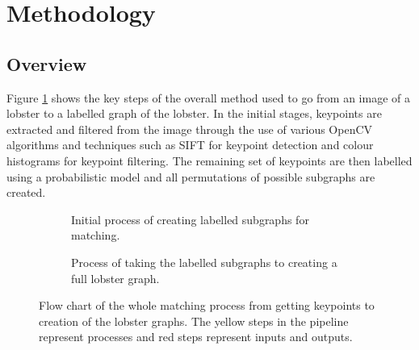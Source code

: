 \section{Methodology}\label{sec:design}
\renewcommand{\imgpath}{tex/design/imgs}
\vspace{1cm}

\subsection{Overview}
Figure \ref{fig:overview} shows the key steps of the overall method used to go from an image of a lobster to a labelled graph of the lobster. In the initial stages, keypoints are extracted and filtered from the image through the use of various OpenCV algorithms and techniques such as SIFT for keypoint detection and colour histograms for keypoint filtering. The remaining set of keypoints are then labelled using a probabilistic model and all permutations of possible subgraphs are created. 
\begin{figure}[H]
\centering
\begin{subfigure}{\textwidth}
\centering
{}
\caption{Initial process of creating labelled subgraphs for matching.}
\vspace{0.7cm}
\end{subfigure}

\begin{subfigure}{\textwidth}
\centering
{}
\caption{Process of taking the labelled subgraphs to creating a full lobster graph.}
\end{subfigure}
\caption{Flow chart of the whole matching process from getting keypoints to creation of the lobster graphs. The yellow steps in the pipeline represent processes and red steps represent inputs and outputs.}
\label{fig:overview}
\end{figure}
